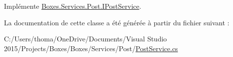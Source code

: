 Implémente \hyperlink{interface_boxes_1_1_services_1_1_post_1_1_i_post_service_adb0e10d59b98f1b2b62e6ce456a59d9b}{Boxes.\+Services.\+Post.\+I\+Post\+Service}.



La documentation de cette classe a été générée à partir du fichier suivant \+:\begin{DoxyCompactItemize}
\item 
C\+:/\+Users/thoma/\+One\+Drive/\+Documents/\+Visual Studio 2015/\+Projects/\+Boxes/\+Boxes/\+Services/\+Post/\hyperlink{_post_service_8cs}{Post\+Service.\+cs}\end{DoxyCompactItemize}
